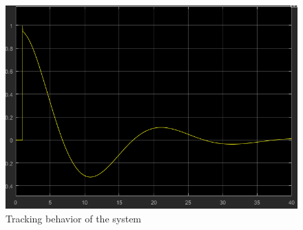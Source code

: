 \begin{figure}
    \centering
    \includegraphics[width=\imagewidth]{images/slope_tracking.png}
    \caption{Tracking behavior of the system}
    \label{fig:tracking}
\end{figure}

